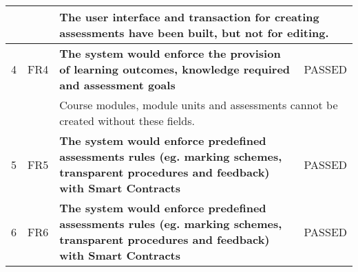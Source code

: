 \begin{table}[!ht]
\begin{tabularx}{\textwidth}{|c|c|X|c|}
		\hline
		                                                                  &                         & \multicolumn{2}{X|}{The user interface and transaction for creating assessments have been built,
			but not for editing.}                                                                                                                                                                                                                                                         \\
		\hline
		4                                                                 & FR4                     & \textbf{The system would enforce the provision of learning outcomes, knowledge required
		and assessment goals}                                             & \cellcolor{green}PASSED                                                                                                                                                                                   \\
		\hline
		                                                                  &                         & \multicolumn{2}{X|}{Course modules, module units and assessments cannot be created without
			these fields.}                                                                                                                                                                                                                                                                \\
		\hline
		5                                                                 & FR5                     & \textbf{The system would enforce predefined assessments
			rules (eg. marking schemes, transparent procedures
		and feedback) with Smart Contracts}                               & \cellcolor{green}PASSED                                                                                                                                                                                   \\
		\hline
		6                                                                 & FR6                     & \textbf{The system would enforce predefined assessments
			rules (eg. marking schemes, transparent procedures
		and feedback) with Smart Contracts}                               & \cellcolor{green}PASSED                                                                                                                                                                                   \\

\end{tabularx}
\end{table}
